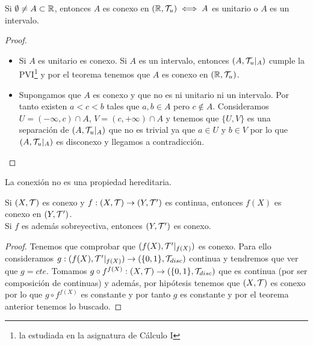 \begin{coro}
    Si $\emptyset\neq A \subset \mathbb{R}$, entonces $A$ es conexo en $(\mathbb{R}, \mathcal{T}_u)\iff A$ es unitario o $A$ es un intervalo.

    \begin{proof}\
        \begin{itemize}
            \item[$\Leftarrow$)] Si $A$ es unitario es conexo. Si $A$ es un intervalo, entonces $(A, \mathcal{T}_u|_A)$ cumple la PVI\footnote{la estudiada en la asignatura de Cálculo I} y por el teorema tenemos que $A$ es conexo en $(\mathbb{R}, \mathcal{T}_u)$.
            \item[$\Rightarrow$)] Supongamos que $A$ es conexo y que no es ni unitario ni un intervalo. Por tanto existen $a<c<b$ tales que $a,b\in A$ pero $c\notin A$. Consideramos $U=(-\infty, c)\cap A$, $V=(c, +\infty)\cap A$ y tenemos que $\{U,V\}$ es una separación de $(A, \mathcal{T}_u|_A)$ que no es trivial ya que $a\in U$ y $b\in V$ por lo que $(A, \mathcal{T}_u|_A)$ es disconexo y llegamos a contradicción.
        \end{itemize}
    \end{proof}
\end{coro}

\begin{observacion}
    La conexión no es una propiedad hereditaria.
    \endsquare
\end{observacion}

\begin{coro}
    Si $(X, \mathcal{T})$ es conexo y $f:(X, \mathcal{T})\to (Y, \mathcal{T}')$ es continua, entonces $f(X)$ es conexo en $(Y, \mathcal{T}')$. \\
    
    Si $f$ es además sobreyectiva, entonces $(Y, \mathcal{T}')$ es conexo.
    \begin{proof}
        Tenemos que comprobar que $(f(X), \mathcal{T}'|_{f(X)})$ es conexo. Para ello consideramos $g:(f(X), \mathcal{T}'|_{f(X)})\to (\{0,1\}, \mathcal{T}_{disc})$ continua y tendremos que ver que $g=cte$. Tomamos $g\circ f^{f(X)}:(X, \mathcal{T})\to (\{0,1\}, \mathcal{T}_{disc})$ que es continua (por ser composición de continuas) y además, por hipótesis tenemos que $(X, \mathcal{T})$ es conexo por lo que $g\circ f^{f(X)}$ es constante y por tanto $g$ es constante y por el teorema anterior tenemos lo buscado.

    \end{proof}
\end{coro}

